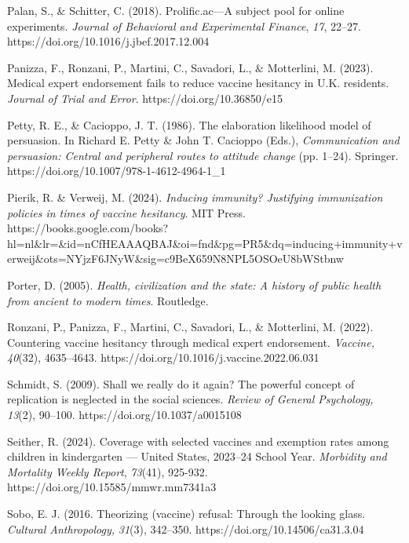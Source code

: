 \documentclass[authordate, empirical]{jote-new-article}
\begin{document}
	Palan, S., \& Schitter, C. (2018). Prolific.ac—A subject pool for online experiments. \emph{Journal of Behavioral and Experimental Finance}, \emph{17}, 22--27. https://doi.org/10.1016/j.jbef.2017.12.004



	Panizza, F., Ronzani, P., Martini, C., Savadori, L., \& Motterlini, M. (2023). Medical expert endorsement fails to reduce vaccine hesitancy in U.K. residents. \emph{Journal of Trial and Error}. https://doi.org/10.36850/e15



	Petty, R. E., \& Cacioppo, J. T. (1986). The elaboration likelihood model of persuasion. In Richard E. Petty \& John T. Cacioppo (Eds.), \emph{Communication and persuasion: Central and peripheral routes to attitude change }(pp. 1--24). Springer. https://doi.org/10.1007/978-1-4612-4964-1\_1



	Pierik, R. \& Verweij, M. (2024). \emph{Inducing immunity? Justifying immunization policies in times of vaccine hesitancy}. MIT Press. https://books.google.com/books?hl=nl\&lr=\&id=nCfHEAAAQBAJ\&oi=fnd\&pg=PR5\&dq=inducing+immunity+verweij\&ots=NYjzF6JNyW\&sig=c9BeX659N8NPL5OSOeU8bWStbnw



	Porter, D. (2005). \emph{Health, civilization and the state: A history of public health from ancient to modern times}. Routledge.



	Ronzani, P., Panizza, F., Martini, C., Savadori, L., \& Motterlini, M. (2022). Countering vaccine hesitancy through medical expert endorsement. \emph{Vaccine,} \emph{40}(32), 4635--4643. https://doi.org/10.1016/j.vaccine.2022.06.031



	Schmidt, S. (2009). Shall we really do it again? The powerful concept of replication is neglected in the social sciences. \emph{Review of General Psychology,} \emph{13}(2), 90--100. https://doi.org/10.1037/a0015108



	Seither, R. (2024). Coverage with selected vaccines and exemption rates among children in kindergarten — United States, 2023--24 School Year. \emph{Morbidity and Mortality Weekly Report},\emph{ 73}(41), 925-932. https://doi.org/10.15585/mmwr.mm7341a3



	Sobo, E. J. (2016. Theorizing (vaccine) refusal: Through the looking glass. \emph{Cultural Anthropology,} \emph{31}(3), 342--350. https://doi.org/10.14506/ca31.3.04
\end{document}
